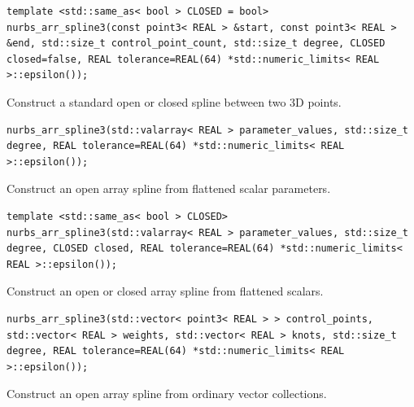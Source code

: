 \par\noindent\begin{minipage}{\linewidth}
\begin{lstlisting}[style=apireference]
template <std::same_as< bool > CLOSED = bool>
nurbs_arr_spline3(const point3< REAL > &start, const point3< REAL > &end, std::size_t control_point_count, std::size_t degree, CLOSED closed=false, REAL tolerance=REAL(64) *std::numeric_limits< REAL >::epsilon());
\end{lstlisting}
{\footnotesize Construct a standard open or closed spline between two 3D points.\par}
\end{minipage}\par\vspace{1pt}
\par\noindent\begin{minipage}{\linewidth}
\begin{lstlisting}[style=apireference]
nurbs_arr_spline3(std::valarray< REAL > parameter_values, std::size_t degree, REAL tolerance=REAL(64) *std::numeric_limits< REAL >::epsilon());
\end{lstlisting}
{\footnotesize Construct an open array spline from flattened scalar parameters.\par}
\end{minipage}\par\vspace{1pt}
\par\noindent\begin{minipage}{\linewidth}
\begin{lstlisting}[style=apireference]
template <std::same_as< bool > CLOSED>
nurbs_arr_spline3(std::valarray< REAL > parameter_values, std::size_t degree, CLOSED closed, REAL tolerance=REAL(64) *std::numeric_limits< REAL >::epsilon());
\end{lstlisting}
{\footnotesize Construct an open or closed array spline from flattened scalars.\par}
\end{minipage}\par\vspace{1pt}
\par\noindent\begin{minipage}{\linewidth}
\begin{lstlisting}[style=apireference]
nurbs_arr_spline3(std::vector< point3< REAL > > control_points, std::vector< REAL > weights, std::vector< REAL > knots, std::size_t degree, REAL tolerance=REAL(64) *std::numeric_limits< REAL >::epsilon());
\end{lstlisting}
{\footnotesize Construct an open array spline from ordinary vector collections.\par}
\end{minipage}\par\vspace{1pt}
